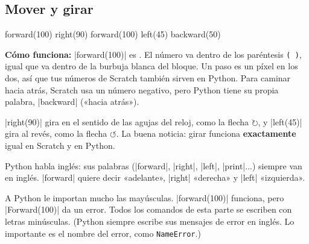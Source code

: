 \subsection*{Mover y girar}

\begin{tcbraster}[raster columns=2, raster equal height=rows, raster column skip=12pt, raster valign=center]
\begin{tcolorbox}[colback=white, colframe=white, boxrule=0pt, valign=center]
\begin{scratch}
\end{scratch}
\end{tcolorbox}
\begin{code}
forward(100)
right(90)
forward(100)
left(45)
backward(50)
\end{code}
\end{tcbraster}

\textbf{Cómo funciona:} \py|forward(100)| es . El número va dentro de los paréntesis \texttt{( )}, igual que va dentro de la burbuja blanca del bloque. Un paso es un píxel en los dos, así que tus números de Scratch también sirven en Python. Para caminar hacia atrás, Scratch usa un número negativo, pero Python tiene su propia palabra, \py|backward| («hacia atrás»).

\py|right(90)| gira en el sentido de las agujas del reloj, como la flecha $\circlearrowright$, y \py|left(45)| gira al revés, como la flecha $\circlearrowleft$. La buena noticia: girar funciona \textbf{exactamente} igual en Scratch y en Python.

Python habla inglés: sus palabras (\py|forward|, \py|right|, \py|left|, \py|print|...) siempre van en inglés. \py|forward| quiere decir «adelante», \py|right| «derecha» y \py|left| «izquierda».

\begin{watchout}
A Python le importan mucho las mayúsculas. \py|forward(100)| funciona, pero \py|Forward(100)| da un error. Todos los comandos de esta parte se escriben con letras minúsculas. (Python siempre escribe sus mensajes de error en inglés. Lo importante es el nombre del error, como \texttt{NameError}.)
\end{watchout}

